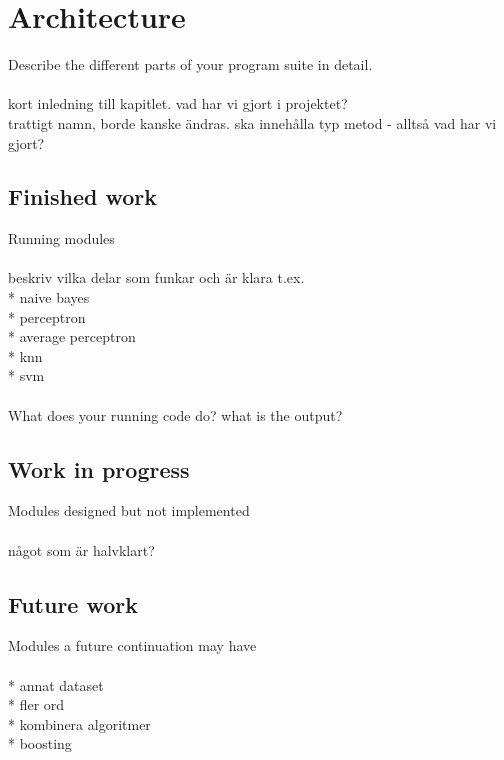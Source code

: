 \chapter{Architecture}
Describe the different parts of your program suite in detail.
\\\\
kort inledning till kapitlet. vad har vi gjort i projektet?\\
trattigt namn, borde kanske ändras. ska innehålla typ metod - alltså vad har vi gjort?

\section{Finished work}
Running modules
\\\\
beskriv vilka delar som funkar och är klara t.ex.\\
* naive bayes\\
* perceptron\\
* average perceptron\\
* knn\\
* svm
\\\\
What does your running code do? what is the output?

\section{Work in progress}
Modules designed but not implemented
\\\\
något som är halvklart?


\section{Future work}
Modules a future continuation may have
\\\\
* annat dataset\\
* fler ord\\
* kombinera algoritmer\\
* boosting\\

